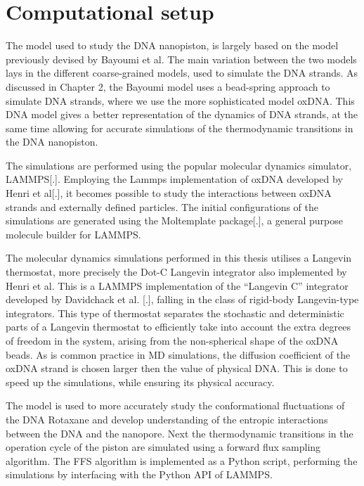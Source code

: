 \section{Computational setup}

The model used to study the DNA nanopiston, is largely based on the model
previously devised by Bayoumi et al. The main variation between the two models lays in
the different coarse-grained models, used to simulate the DNA strands. As discussed in
Chapter 2, the Bayoumi model uses a bead-spring approach to simulate DNA strands, where
we use the more sophisticated model oxDNA. This DNA model gives a better
representation of the dynamics of DNA strands, at the same time allowing for accurate
simulations of the thermodynamic transitions in the DNA nanopiston.

The simulations are performed using the popular molecular dynamics simulator, LAMMPS[.].
Employing the Lammps implementation of oxDNA developed by Henri et al[.], it becomes
possible to study the interactions between oxDNA strands and externally defined
particles. The initial configurations of the simulations are generated using the
Moltemplate package[.], a general purpose molecule builder for LAMMPS.

The molecular dynamics simulations performed in this thesis utilises a Langevin
thermostat, more precisely the Dot-C Langevin integrator also implemented by Henri et
al. This is a LAMMPS implementation of the “Langevin C” integrator developed by
Davidchack et al. [.], falling in the class of rigid-body Langevin-type integrators.
This type of thermostat separates the stochastic and deterministic parts of a Langevin
thermostat to efficiently take into account the extra degrees of freedom in the system,
arising from the non-spherical shape of the oxDNA beads. As is common practice in MD
simulations, the diffusion coefficient of the oxDNA strand is chosen larger then the
value of physical DNA. This is done to speed up the simulations, while ensuring its
physical accuracy.

The model is used to more accurately study the conformational fluctuations of
the DNA Rotaxane and develop understanding of the entropic interactions between the DNA
and the nanopore. Next the thermodynamic transitions in the operation cycle of the piston
are simulated using a forward flux sampling algorithm. The FFS algorithm is implemented
as a Python script, performing the simulations by interfacing with the Python API of
LAMMPS.
